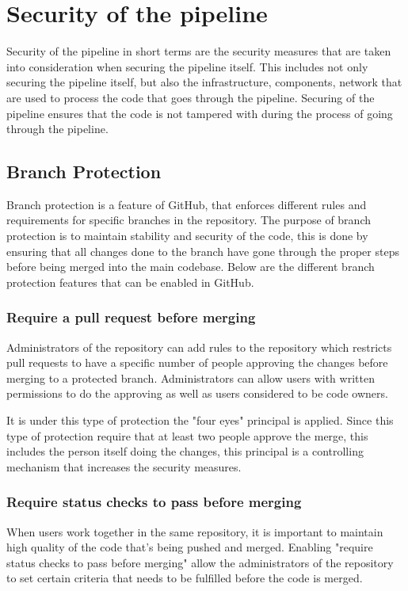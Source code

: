\section{Security of the pipeline}
Security of the pipeline in short terms are the security measures that are taken into consideration when securing the pipeline itself. This includes not only securing the pipeline itself, but also the infrastructure, components, network that are used to process the code that goes through the pipeline. Securing of the pipeline ensures that the code is not tampered with during the process of going through the pipeline. 


\subsection{Branch Protection}
\label{branchprotection}
Branch protection is a feature of GitHub, that enforces different rules and requirements for specific branches in the repository. The purpose of branch protection is to maintain stability and security of the code, this is done by ensuring that all changes done to the branch have gone through the proper steps before being merged into the main codebase. Below are the different branch protection features that can be enabled in GitHub. \cite{ProtectedBranches}
\\
\subsubsection{Require a pull request before merging}
Administrators of the repository can add rules to the repository which restricts pull requests to have a specific number of people approving the changes before merging to a protected branch. Administrators can allow users with written permissions to do the approving as well as users considered to be code owners. 

It is under this type of protection the "four eyes" principal is applied. Since this type of protection require that at least two people approve the merge, this includes the person itself doing the changes, this principal is a controlling mechanism that increases the security measures. 
\\
\subsubsection{Require status checks to pass before merging}
When users work together in the same repository, it is important to maintain high quality of the code that's being pushed and merged. Enabling "require status checks to pass before merging" allow the administrators of the repository to set certain criteria that needs to be fulfilled before the code is merged. 
\newpage
